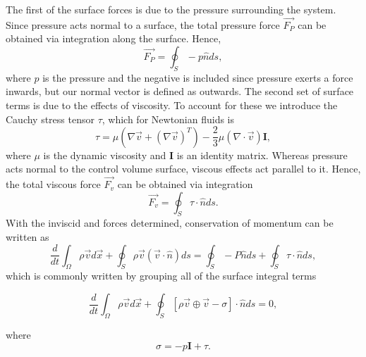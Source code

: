 The first of the surface forces is due to the pressure surrounding the system. Since pressure acts normal to a surface, the total pressure force $\vec{F_P}$ can be obtained via integration along the surface. Hence,
\begin{equation}
	\vec{F_P} = \oint_S -p\hat{n} ds,
\end{equation}
where $p$ is the pressure and the negative is included since pressure exerts a force inwards, but our normal vector is defined as outwards. The second set of surface terms is due to the effects of viscosity. To account for these we introduce the Cauchy stress tensor $\tau$, which for Newtonian fluids is
\begin{equation}
	\label{eqn:cauchytensor}
	\tau = \mu \left(\nabla \vec{v} + \left(\nabla \vec{v} \right)^T \right) - \frac{2}{3} \mu \left(\nabla \cdot \vec{v} \right) \mathbf{I},
\end{equation}
where $\mu$ is the dynamic viscosity and $\mathbf{I}$ is an identity matrix. Whereas pressure acts normal to the control volume surface, viscous effects act parallel to it. Hence, the total viscous force $\vec{F_v}$ can be obtained via integration
\begin{equation}
	\vec{F_v} = \oint_S \tau \cdot \hat{n} ds.
\end{equation}
With the inviscid and forces determined, conservation of momentum can be written as
\begin{equation}
	 \frac{d}{dt}\int_\Omega \rho \vec{v} d\vec{x} + \oint_S \rho \vec{v} (\vec{v} \cdot \hat{n}) ds = \oint_S -P\hat{n} ds + \oint_S \tau \cdot \hat{n} ds,
\end{equation}
which is commonly written by grouping all of the surface integral terms
\begin{eqBox}
\begin{equation}
	 \frac{d}{dt}\int_\Omega \rho \vec{v} d\vec{x} + \oint_S \left[ \rho \vec{v} \oplus \vec{v} - \sigma \right]\cdot \hat{n} ds =  0,
\end{equation}
\end{eqBox}
where
\begin{equation}
	\sigma = -p \mathbf{I} + \tau.
\end{equation}


